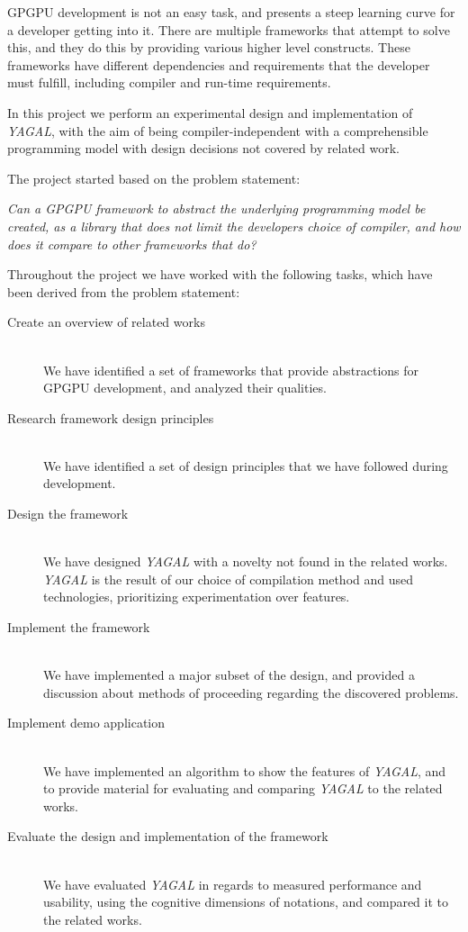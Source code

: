GPGPU development is not an easy task, and presents a steep learning curve for a developer getting into it. There are multiple frameworks that attempt to solve this, and they do this by providing various higher level constructs. These frameworks have different dependencies and requirements that the developer must fulfill, including compiler and run-time requirements. 

In this project we perform an experimental design and implementation of \textit{YAGAL}, with the aim of being compiler-independent with a comprehensible programming model with design decisions not covered by related work.

The project started based on the problem statement:

\textit{Can a GPGPU framework to abstract the underlying programming model be created, as a library that does not limit the developers choice of compiler, and how does it compare to other frameworks that do?}

Throughout the project we have worked with the following tasks, which have been derived from the problem statement:

\begin{description}
\item[Create an overview of related works]\hfill \\
We have identified a set of frameworks that provide abstractions for GPGPU development, and analyzed their qualities.
\item[Research framework design principles]\hfill \\
We have identified a set of design principles that we have followed during development.
\item[Design the framework]\hfill \\
We have designed \textit{YAGAL} with a novelty not found in the related works. \textit{YAGAL} is the result of our choice of compilation method and used technologies, prioritizing experimentation over features.
\item[Implement the framework]\hfill \\
We have implemented a major subset of the design, and provided a discussion about methods of proceeding regarding the discovered problems. 
\item[Implement demo application]\hfill \\
We have implemented an algorithm to show the features of \textit{YAGAL}, and to provide material for evaluating and comparing \textit{YAGAL} to the related works.
\item[Evaluate the design and implementation of the framework]\hfill \\
We have evaluated \textit{YAGAL} in regards to measured performance and usability, using the cognitive dimensions of notations, and compared it to the related works.
\end{description}

